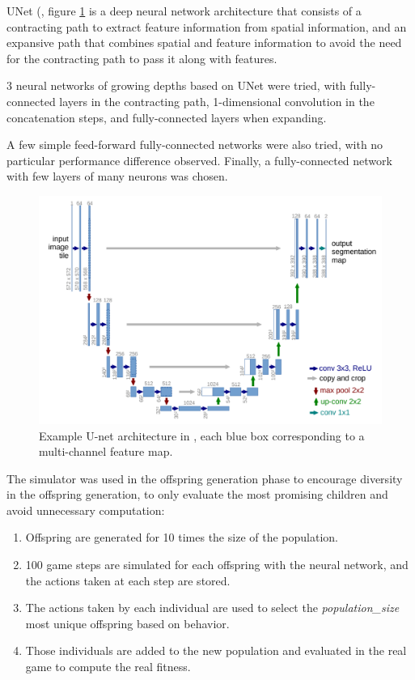 UNet (\cite{unet}, figure \ref{fig:unet} is a deep neural network architecture that consists of a contracting path to extract feature information from spatial information, and an expansive path that combines spatial and feature information to avoid the need for the contracting path to pass it along with features.

3 neural networks of growing depths based on UNet were tried, with fully-connected layers in the contracting path, 1-dimensional convolution in the concatenation steps, and fully-connected layers when expanding. 

A few simple feed-forward fully-connected networks were also tried, with no particular performance difference observed. Finally, a fully-connected network with few layers of many neurons was chosen.

\begin{figure}[H]
 \centering
 \captionsetup{justification=centering, margin=0.5cm}
 \includegraphics[width=14cm]{images/unet.PNG}
\caption{Example U-net architecture in \cite{unet}, each blue box corresponding to a multi-channel feature map.}
 \label{fig:unet}
\end{figure}

The simulator was used in the offspring generation phase to encourage diversity in the offspring generation, to only evaluate the most promising children and avoid unnecessary computation:
\begin{enumerate}
    \item Offspring are generated for 10 times the size of the population.
    \item 100 game steps are simulated for each offspring with the neural network, and the actions taken at each step are stored.
    \item The actions taken by each individual are used to select the \textit{population\_size} most unique offspring based on behavior.
    \item Those individuals are added to the new population and evaluated in the real game to compute the real fitness.
\end{enumerate}

